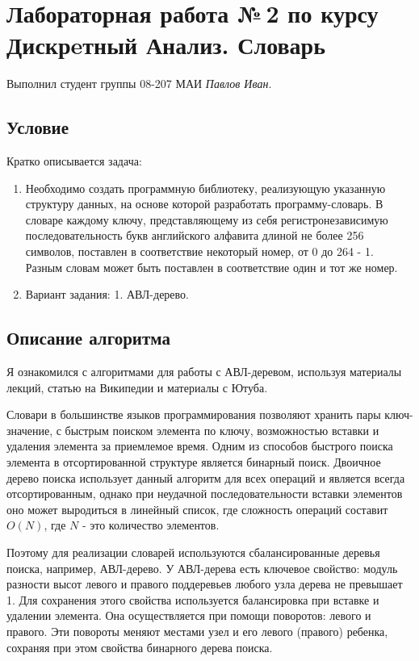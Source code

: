 \documentclass[12pt]{article}
\begin{document}
	
	\section*{Лабораторная работа №\,2 по курсу Дискрeтный Анализ. Словарь}
	
	Выполнил студент группы 08-207 МАИ \textit{Павлов Иван}.
	
	\subsection*{Условие}
	
	Кратко описывается задача: 
	\begin{enumerate}
		\item Необходимо создать программную библиотеку, реализующую
		указанную структуру данных, на основе которой разработать
		программу-словарь. В словаре каждому ключу, представляющему из
		себя регистронезависимую последовательность букв английского
		алфавита длиной не более 256 символов, поставлен в соответствие
		некоторый номер, от 0 до 264 - 1. Разным словам может быть
		поставлен в соответствие один и тот же номер.
		\item Вариант задания: 1. АВЛ-дерево. 
	\end{enumerate}
	
	\subsection*{Описание алгоритма}
	
	\textbf{}
	
	Я ознакомился с алгоритмами для работы с АВЛ-деревом, используя материалы лекций, статью на Википедии и материалы с Ютуба. 
	
	Словари в большинстве языков программирования позволяют хранить пары ключ-значение, с быстрым поиском элемента по ключу, возможностью вставки и удаления элемента за приемлемое время. Одним из способов быстрого поиска элемента в отсортированной структуре является бинарный поиск. Двоичное дерево поиска использует данный алгоритм для всех операций и является всегда отсортированным, однако при неудачной последовательности вставки элементов оно может выродиться в линейный список, где сложность операций составит $O(N)$, где $N$ - это количество элементов.
	
	Поэтому для реализации словарей используются сбалансированные деревья поиска, например, АВЛ-дерево. У АВЛ-дерева есть ключевое свойство: модуль разности высот левого и правого поддеревьев любого узла дерева не превышает 1. Для сохранения этого свойства используется балансировка при вставке и удалении элемента. Она осуществляется при помощи поворотов: левого и правого. Эти повороты меняют местами узел и его левого (правого) ребенка, сохраняя при этом свойства бинарного дерева поиска.
	
\end{document}

